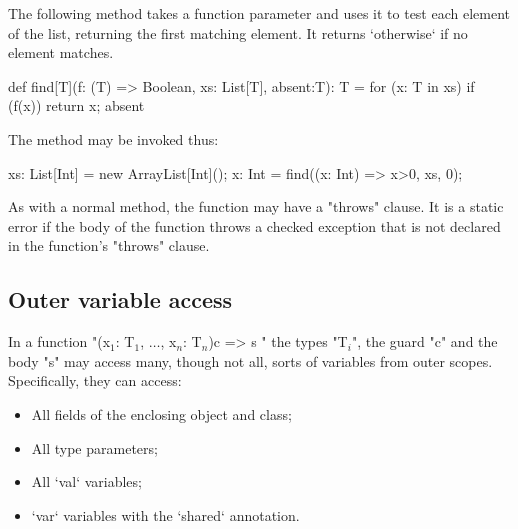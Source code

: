 \begin{example}
The following method takes a function parameter and uses it to
test each element of the list, returning the first matching
element.  It returns \xcd`otherwise` if no element matches.

\begin{xten}

def find[T](f: (T) => Boolean, xs: List[T], absent:T): T = {
  for (x: T in xs)
    if (f(x)) return x;
  absent
  }
\end{xten}

The method may be invoked thus:
\begin{xten}
xs: List[Int] = new ArrayList[Int]();
x: Int = find((x: Int) => x>0, xs, 0);
\end{xten}

\end{example}

As with a normal method, the function may have a \xcd"throws"
clause. It is a static error if the body of the function throws a
checked exception that is not declared in the function's \xcd"throws"
clause.

\subsection{Outer variable access}

In a function
\xcdmath"(x$_1$: T$_1$, $\dots$, x$_n$: T$_n$){c} => { s }"
the types \xcdmath"T$_i$", the guard \xcd"c" and the body \xcd"s"
may access many, though not all, sorts of variables from outer scopes.  
Specifically, they can access: 
\begin{itemize}
\item All fields of the enclosing object and class;
\item All type parameters;
\item All \xcd`val` variables;
\item \xcd`var` variables with the \xcd`shared` annotation. 
\end{itemize}



